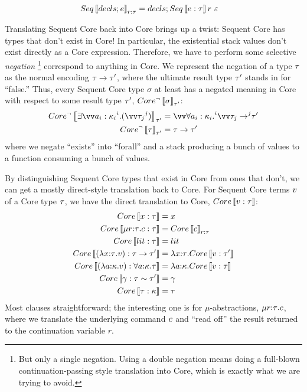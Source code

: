 \documentclass{article}
\begin{document}
\begin{align*}
  Seq\left\llbracket{decls; e}\right\rrbracket_{r:\tau} &= decls; Seq\left\llbracket{e: \tau}\right\rrbracket r ~ \varepsilon
\end{align*}

Translating Sequent Core back into Core brings up a twist: Sequent Core has
types that don't exist in Core!  In particular, the existential stack values
don't exist directly as a Core expression.  Therefore, we have to perform some
selective \emph{negation}%
\footnote{But only a single negation.  Using a double negation means doing a
  full-blown continuation-passing style translation into Core, which is exactly
  what we are trying to avoid.}
correspond to anything in Core.  We represent the negation of a type $\tau$ as
the normal encoding $\tau \to \tau'$, where the ultimate result type $\tau'$ stands
in for ``false.''  Thus, every Sequent Core type $\sigma$ at least has a negated
meaning in Core with respect to some result type $\tau'$,
$Core^\neg\left\llbracket{\sigma}\right\rrbracket_{\tau'}$:
\begin{align*}
  Core^\neg\trans{\stackty{\vect[i]{a_i:\ki_i}}{\vect[j]{\ty_j}}}_{\ty'}
  &=
  \vect[i]{\forall a_i:\ki_i.} \vect[j]{\ty_j \to } \ty'
  \\
  Core^\neg\trans{\ty}_{\ty'}
  &=
  \ty \to \ty'
\end{align*}
where we negate ``exists'' into ``forall'' and a stack producing a bunch of
values to a function consuming a bunch of values.

By distinguishing Sequent Core types that exist in Core from ones that don't, we
can get a mostly direct-style translation back to Core.  For Sequent Core terms
$v$ of a Core type $\tau$, we have the direct translation to Core,
$Core\left\llbracket{v: \tau}\right\rrbracket$:
\begin{align*}
  Core\left\llbracket{x : \tau}\right\rrbracket &= x
  \\
  Core\left\llbracket{\mu{r{:}{\tau}}.c: \tau}\right\rrbracket
  &=
  Core\left\llbracket{c}\right\rrbracket_{r:\tau}
  \\
  Core\left\llbracket{lit: \tau}\right\rrbracket &= lit
  \\
  Core\left\llbracket{(\lambda{x{:}{\tau}}. v) : \tau\to \tau'}\right\rrbracket
  &=
  \lambda{x{:}{\tau}}. Core\left\llbracket{v: \tau'}\right\rrbracket
  \\
  Core\left\llbracket{(\lambda{a{:}{\kappa}}. v) : \forall a{:}{\kappa}. \tau}\right\rrbracket
  &=
  \lambda{a{:}{\kappa}}. Core\left\llbracket{v: \tau}\right\rrbracket
  \\
  Core\left\llbracket{\gamma: \tau\sim \tau'}\right\rrbracket &= \gamma
  \\
  Core\left\llbracket{\tau: \kappa}\right\rrbracket &= \tau
\end{align*}
Most clauses straightforward; the interesting one is for $\mu$-abstractions,
$\mu{r{:}{\tau}}.c$, where we translate the underlying command $c$ and
``read off'' the result returned to the continuation variable $r$.
\end{document}
